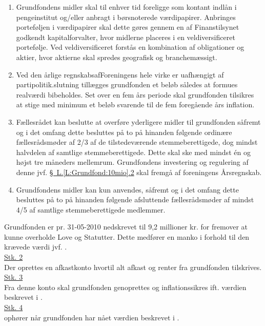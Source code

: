 \begin{list}
\begin{enumerate}
\item Grundfondens midler skal til enhver tid foreligge som kontant indlån i pengeinstitut og/eller anbragt i børsnoterede værdipapirer. Anbringes porteføljen i værdipapirer skal dette gøres gennem en af Finanstilsynet godkendt kapitalforvalter, hvor midlerne placeres i en veldiversificeret portefølje. Ved veldiversificeret forstås en kombination af obligationer og aktier, hvor aktierne skal spredes geografisk og branchemæssigt.
\item Ved den årlige regnskabsafForeningens hele virke er uafhængigt af partipolitik.slutning tillægges grundfonden et beløb således at formues realværdi bibeholdes. Set over en fem års periode skal grundfonden tilsikres at stige med minimum et beløb svarende til de fem foregående års inflation.
\item Fællesrådet kan beslutte at overføre yderligere midler til grundfonden såfremt og i det omfang dette besluttes på to på hinanden følgende ordinære fællesrådsmøder af 2/3 af de tilstedeværende stemmeberettigede, dog mindst halvdelen af samtlige stemmeberettigede. Dette skal ske med mindst én og højst tre måneders mellemrum. Grundfondens investering og regulering af denne jvf. \hyperref[L:Grundfond:10mio]{\S \ L.\ref*{L:Grundfond:10mio}.2} skal fremgå af foreningens Årsregnskab.
\item Grundfondens midler kan kun anvendes, såfremt og i det omfang dette besluttes på to på hinanden følgende afsluttende fællesrådsmøder af mindst 4/5 af samtlige stemmeberettigede medlemmer.
\end{enumerate}

\item \label{L:Grundfond:9.2mio} Grundfonden er pr. 31-05-2010 nedskrevet til 9,2 millioner kr. for fremover at kunne overholde Love og Statutter. Dette medfører en manko i forhold til den krævede værdi jvf. .\\

\underline{Stk. 2}\\
Der oprettes en afkastkonto hvortil alt afkast og renter fra grundfonden tilskrives.\\

\underline{Stk. 3}\\
Fra denne konto skal grundfonden genoprettes og inflationssikres ift. værdien beskrevet i .\\


\underline{Stk. 4}\\
 ophører når grundfonden har nået værdien beskrevet i .

\end{list}

